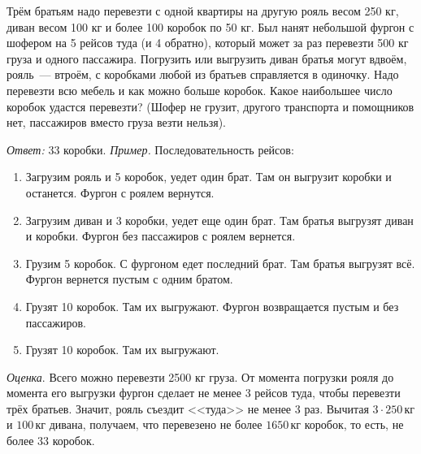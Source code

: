\problem
Трём братьям надо перевезти с одной квартиры на другую рояль весом 250 кг,
диван весом 100 кг и более 100 коробок по 50 кг.
Был нанят небольшой фургон с шофером на 5 рейсов туда (и 4 обратно), который
может за раз перевезти 500 кг груза и одного пассажира.
Погрузить или выгрузить диван братья могут вдвоём, рояль~--- втроём, с
коробками любой из братьев справляется в одиночку.
Надо перевезти всю мебель и как можно больше коробок.
Какое наибольшее число коробок удастся перевезти?
(Шофер не грузит, другого транспорта и помощников нет, пассажиров вместо груза
везти нельзя).

\solution
\emph{Ответ:} 33 коробки.
\emph{Пример.}
Последовательность рейсов:
\begin{enumerate}
\item
Загрузим рояль и 5 коробок, уедет один брат.
Там он выгрузит коробки и останется.
Фургон с роялем вернутся.
\item
Загрузим диван и 3 коробки, уедет еще один брат.
Там братья выгрузят диван и коробки.
Фургон без пассажиров с роялем вернется.
\item
Грузим 5 коробок.
С фургоном едет последний брат.
Там братья выгрузят всё.
Фургон вернется пустым с одним братом.
\item
Грузят 10 коробок.
Там их выгружают.
Фургон возвращается пустым и без пассажиров.
\item
Грузят 10 коробок.
Там их выгружают.
\end{enumerate}
\emph{Оценка}.
Всего можно перевезти 2500 кг груза.
От момента погрузки рояля до момента его выгрузки фургон сделает не менее 3
рейсов туда, чтобы перевезти трёх братьев.
Значит, рояль съездит <<туда>> не менее 3 раз.
Вычитая $3 \cdot 250 \, \text{кг}$ и $100 \, \text{кг}$ дивана, получаем, что
перевезено не более $1650 \, \text{кг}$ коробок, то есть, не более 33 коробок.
\endproblem
